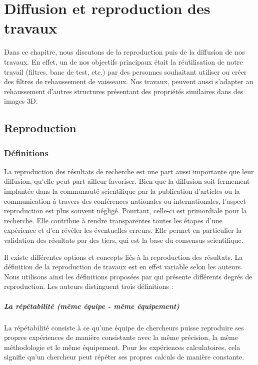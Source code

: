 \chapter{Diffusion et reproduction des travaux}
\label{sec:reproductibility}

Dans ce chapitre, nous discutons de la reproduction puis de la diffusion de nos travaux. En effet, un de nos objectifs principaux était la réutilisation de notre travail (filtres, banc de test, etc.) par des personnes souhaitant utiliser ou créer des filtres de rehaussement de vaisseaux. Nos travaux, peuvent aussi s'adapter au rehaussement d'autres structures présentant des propriétés similaires dans des images 3D.

\section{Reproduction}
\subsection{Définitions}

La reproduction des résultats de recherche est une part aussi importante que leur diffusion, qu'elle peut part ailleur favoriser. Bien que la diffusion soit fermement implantée dans la communauté scientifique par la publication d'articles ou la communication à travers des conférences nationales ou internationales, l'aspect reproduction est plus souvent négligé. Pourtant, celle-ci est primordiale pour la recherche. Elle contribue à rendre transparentes toutes les étapes d'une expérience et d'en révéler les éventuelles erreurs. Elle permet en particulier la validation des résultats par des tiers, qui est la base du consensus scientifique.

Il existe différentes options et concepts liés à la reproduction des résultats. La définition de la reproduction de travaux est en effet variable selon les auteurs. Nous utilisons ainsi les définitions proposées par \cite{ACMReproDef2016} qui présente différents degrés de reproduction. Les auteurs distinguent trois définitions : 

\paragraph{La répétabilité (même équipe - même équipement)}

La répétabilité consiste à ce qu'une équipe de chercheurs puisse reproduire ses propres expériences de manière consistante avec la même précision, la même méthodologie et le même équipement. Pour les expériences calculatoires, cela signifie qu'un chercheur peut répéter ses propres calculs de manière constante.


